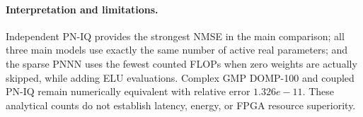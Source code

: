 \documentclass[10pt]{article}
\begin{document}
\paragraph{Interpretation and limitations.} Independent PN-IQ provides the strongest NMSE in the main comparison; all three main models use exactly the same number of active real parameters; and the sparse PNNN uses the fewest counted FLOPs when zero weights are actually skipped, while adding ELU evaluations. Complex GMP DOMP-100 and coupled PN-IQ remain numerically equivalent with relative error $1.326e-11$. These analytical counts do not establish latency, energy, or FPGA resource superiority.
\end{document}
